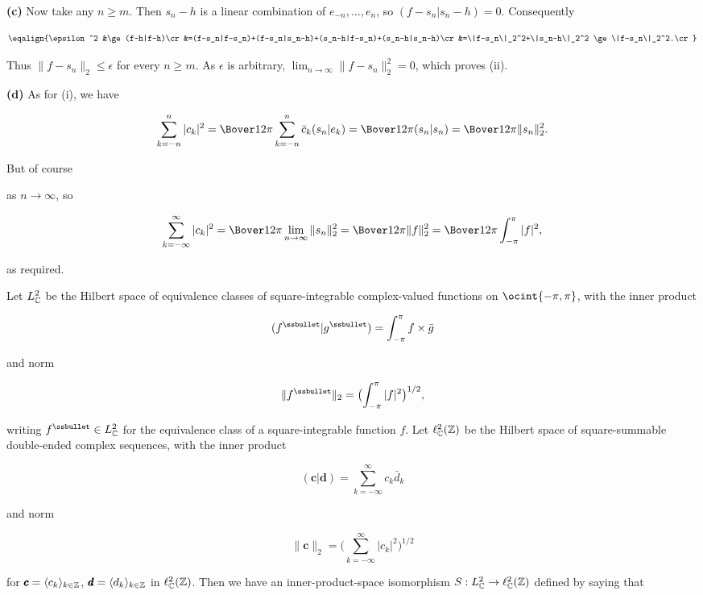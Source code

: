 {

\medskip

{\bf (c)} Now take any $n\ge m$.   Then $s_n-h$ is a linear combination
of  $e_{-n},\ldots,e_n$, so $(f-s_n|s_n-h)=0$.   Consequently

$$\eqalign{\epsilon^2
&\ge(f-h|f-h)\cr
&=(f-s_n|f-s_n)+(f-s_n|s_n-h)+(s_n-h|f-s_n)+(s_n-h|s_n-h)\cr
&=\|f-s_n\|_2^2+\|s_n-h\|_2^2
\ge\|f-s_n\|_2^2.\cr}$$

\noindent Thus $\|f-s_n\|_2\le\epsilon$ for every $n\ge m$.   As
$\epsilon$ is arbitrary, $\lim_{n\to\infty}\|f-s_n\|_2^2=0$, which
proves (ii).

\medskip

{\bf (d)} As for (i), we have

$$\sum_{k=-n}^n|c_k|^2=\Bover1{2\pi}\sum_{k=-n}^n\bar c_k(s_n|e_k)
=\Bover1{2\pi}(s_n|s_n)=\Bover1{2\pi}\|s_n\|_2^2.$$

\noindent But of course


\noindent as $n\to\infty$, so

$$\sum_{k=-\infty}^{\infty}|c_k|^2
=\Bover1{2\pi}\lim_{n\to\infty}\|s_n\|_2^2=\Bover1{2\pi}\|f\|_2^2
=\Bover1{2\pi}\int_{-\pi}^{\pi}|f|^2,$$

\noindent as required.
}%

 Let $L_{\Bbb C}^2$ be the Hilbert space of
equivalence classes of square-integrable complex-valued functions on
$\ocint{-\pi,\pi}$, with the inner product

$$(f^{\ssbullet}|g^{\ssbullet})
=\int_{-\pi}^{\pi}f\times\bar g$$

\noindent and norm

$$\|f^{\ssbullet}\|_2
=\bigl(\int_{-\pi}^{\pi}|f|^2\bigr)^{1/2},$$

\noindent writing $f^{\ssbullet}\in L_{\Bbb C}^2$ for the equivalence
class of a
square-integrable function $f$.   Let $\ell_{\Bbb C}^2(\Bbb Z)$ be the
Hilbert space of
square-summable double-ended complex sequences, with the inner product

$$(\pmb{c}|\pmb{d})=\sum_{k=-\infty}^{\infty}c_k\bar d_k$$

\noindent and norm

$$\|\pmb{c}\|_2
=\bigl(\sum_{k=-\infty}^{\infty}|c_k|^2\bigr)^{1/2}$$

\noindent for $\pmb{c}=\langle c_k\rangle_{k\in\Bbb Z}$,
$\pmb{d}=\langle d_k\rangle_{k\in\Bbb Z}$ in $\ell_{\Bbb C}^2(\Bbb Z)$.
Then we have an inner-product-space isomorphism
$S:L_{\Bbb C}^2\to\ell_{\Bbb C}^2(\Bbb Z)$
defined by saying that

